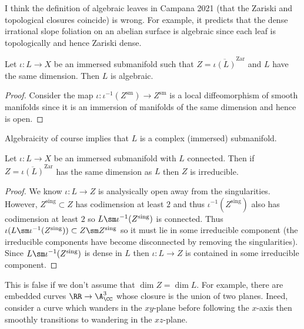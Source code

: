 \documentclass[12pt]{article}
\begin{document}
\begin{rmk}
I think the definition of algebraic leaves in Campana 2021 (that the Zariski and topological closures coincide) is wrong. For example, it predicts that the dense irrational slope foliation on an abelian surface is algebraic since each leaf is topologically and hence Zariski dense. 
\end{rmk}

\begin{lemma}
Let $\iota : L \to X$ be an immersed submanifold such that $Z = \overline{\iota(L)}^{\text{Zar}}$ and $L$ have the same dimension. Then $L$ is algebraic.
\end{lemma}

\begin{proof}
Consider the map $\iota : \iota^{-1}(Z^{\text{sm}}) \to Z^{\text{sm}}$ is a local diffeomorphism of smooth manifolds since it is an immersion of manifolds of the same dimension and hence is open. 
\end{proof}

\begin{rmk}
Algebraicity of course implies that $L$ is a complex (immersed) submanifold.
\end{rmk}

\begin{lemma}
Let $\iota : L \to X$ be an immersed submanifold with $L$ connected. Then if $Z = \overline{\iota(L)}^{\text{Zar}}$ has the same dimension as $L$ then $Z$ is irreducible. 
\end{lemma}

\begin{proof}
We know $\iota : L \to Z$ is analysically open away from the singularities. However, $Z^{\text{sing}} \subset Z$ has codimension at least $2$ and thus $\iota^{-1}(Z^{\text{sing}})$ also has codimension at least $2$ so $L \sm \iota^{-1}(Z^{\text{sing}})$ is connected. Thus $\iota(L \sm \iota^{-1}(Z^\text{sing})) \subset Z \sm Z^{\text{sing}}$ so it must lie in some irreducible component (the irreducible components have become disconnected by removing the singularities). Since $L \sm \iota^{-1}(Z^{\text{sing}})$ is dense in $L$ then $\iota : L \to Z$ is contained in some irreducible component.  
\end{proof}

\begin{rmk}
This is false if we don't assume that $\dim{Z} = \dim{L}$. For example, there are embedded curves $\RR \to \A^3_{\CC}$ whose closure is the union of two planes. Ineed, consider a curve which wanders in the $xy$-plane before following the $x$-axis then smoothly transitions to wandering in the $xz$-plane. 
\end{rmk}
\end{document}
